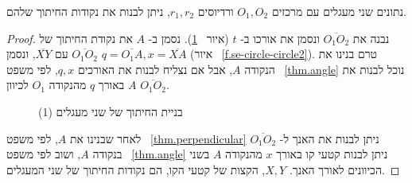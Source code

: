 \begin{theorem}\label{thm.two-circles}
נתונים שני מעגלים עם מרכזים
$O_1,O_2$
ורדיוסים
$r_1,r_2$,
ניתן לבנות את נקודות החיתוך שלהם.
\end{theorem}
\begin{proof}
נבנה את
$\overline{O_1O_2}$
ונסמן את אורכו ב-%
$t$
(איור%
~\ref{f.se-circle-circle1}).
נסמן ב-%
$A$
את נקודת החיתוך של
$\overline{O_1O_2}$
עם
$\overline{XY}$,
ונסמן
$q=\overline{O_1A},x=\overline{XA}$
(איור%
~\ref{f.se-circle-circle2}).
טרם בנינו את הנקודה
$A$,
אבל אם נצליח לבנות את האורכים
$q,x$,
לפי משפט~%
\ref{thm.angle}
נוכל לבנות את 
$A$
באורך
$q$
מהנקודה
$O_1$
לכיוון
$\overline{O_1O_2}$.
\begin{figure}[tb]
\begin{center}
\end{center}
\caption{בניית החיתוך של שני מעגלים (1)}\label{f.se-circle-circle1}
\end{figure}
לאחר שבנינו את
$A$,
לפי משפט~%
\ref{thm.perpendicular}
ניתן לבנות את האנך ל-%
$\overline{O_1O_2}$
בנקודה
$A$,
ושוב לפי משפט~%
\ref{thm.angle}
ניתן לבנות קטעי קו באורך
$x$
מהנקודה
$A$
בשני הכיוונים לאורך האנך.
$X,Y$,
הקצות של קטעי הקו, הם נקודות החיתוך של שני המעגלים.


\end{proof}
